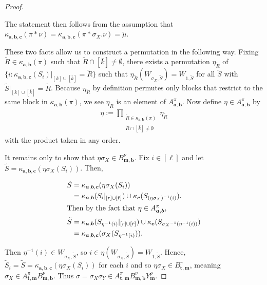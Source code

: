 \documentclass[10pt]{amsart}
\theoremstyle{definition}
\theoremstyle{definition}
\theoremstyle{plain}
\theoremstyle{remark}
\theoremstyle{plain}
\theoremstyle{plain}
\newcommand{\bfa}{{\boldsymbol{a}}}
\newcommand{\bfb}{{\boldsymbol{b}}}
\newcommand{\bfc}{{\boldsymbol{c}}}
\newcommand{\bft}{{\boldsymbol{t}}}
\newcommand{\bfm}{{\boldsymbol{m}}}
\newcommand{\tmu}{{\tilde{\mu}}}
\newcommand{\tS}{{\tilde{S}}}
\newcommand{\tR}{{\tilde{R}}}
\newcommand{\ov}[1]{\bar{#1}}
\newcommand{\ovb}[1]{\left[\ov{#1}\right]}
\begin{document}
\begin{proof}
\begin{enumerate}
The statement then follows from the assumption that $\kappa_{\bfa,\bfb,\bfc}(\pi\ast\nu)=\kappa_{\bfa,\bfb,\bfc}(\pi\ast \sigma_X.\nu)=\tmu$.
\end{enumerate}

These two facts allow us to construct a permutation in the following way. Fixing $\tR\in\kappa_{\bfa,\bfb}(\pi)$ such that $\tR\cap \ovb{k}\neq\emptyset$, there exists a permutation $\eta_{\tR}$ of $\{i:\kappa_{\bfa,\bfb,\bfc}(S_i)|_{[k]\cup\ovb{k}}=\tR\}$ such that $\eta_\tR(W_{\sigma_X,\tS})=W_{1,\tS}$ for all $\tS$ with $\tS|_{[k]\cup\ovb{k}}=\tR$. Because $\eta_\tR$ by definition permutes only blocks that restrict to the same block in $\kappa_{\bfa,\bfb}(\pi)$, we see $\eta_\tR$ is an element of $A_{\bfa,\bfb}^\pi$. Now define $\eta\in A_{\bfa,\bfb}^\pi$ by \begin{align*}
    \eta:=\prod_{\substack{\tR\in\kappa_{\bfa,\bfb}(\pi)\\\tR\cap\ovb{k}\neq\emptyset}}\eta_\tR
\end{align*} with the product taken in any order.

It remains only to show that $\eta\sigma_X\in B_{\bfm,\bfb}^\nu$. Fix $i\in[\ell]$ and let $\tS=\kappa_{\bfa,\bfb,\bfc}(\eta\sigma_X(S_i))$. Then,

\begin{align*}
    \tS&=\kappa_{\bfa,\bfb,\bfc}(\eta\sigma_X(S_i))\\
    &=\kappa_{\bfa,\bfb}(S_i|_{[r]\cup\ovb{r}})\cup\kappa_\bfc(S_{(\eta\sigma_X)^{-1}(i)}).\\
    \intertext{Then by the fact that $\eta\in A_{\bfa,\bfb}^\pi$,}
    \tS&=\kappa_{\bfa,\bfb}(S_{\eta^{-1}(i)}|_{[r]\cup\ovb{r}})\cup\kappa_\bfc(S_{{\sigma_X}^{-1}(\eta^{-1}(i))})\\
    &=\kappa_{\bfa,\bfb,\bfc}(\sigma_X(S_{\eta^{-1}(i)})).
\end{align*}

Then $\eta^{-1}(i)\in W_{\sigma_X,\tS}$, so $i\in \eta(W_{\sigma_X,\tS})=W_{1,\tS}$. Hence, $\tS_i=\tS=\kappa_{\bfa,\bfb,\bfc}(\eta\sigma_X(S_i))$ for each $i$ and so $\eta\sigma_X\in B^{\pi}_{\bft,\bfm}$, meaning $\sigma_X\in A_{\bft,\bfm}^\pi B_{\bfm,\bfb}^\nu$. Thus $\sigma=\sigma_X\sigma_Y\in A_{\bft,\bfm}^\pi B_{\bfm,\bfb}^\nu Y_\bfm^\rho$.
\end{proof}
\end{document}

